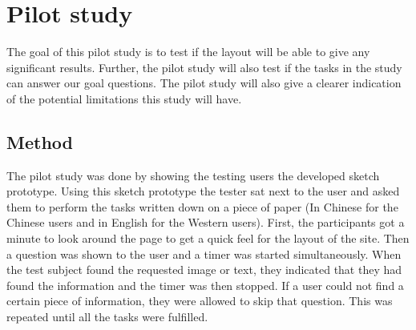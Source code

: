 
\chapter{Pilot study} %

\label{Pilotstudy} %

The goal of this pilot study is to test if the layout will be able to give any significant results. Further, the pilot study will also test if the tasks in the study can answer our goal questions. The pilot study will also give a clearer indication of the potential limitations this study will have.
\section{Method}
The pilot study was done by showing the testing users the developed sketch prototype. Using this sketch prototype the tester sat next to the user and asked them to perform the tasks written down on a piece of paper (In Chinese for the Chinese users and in English for the Western users). First, the participants got a minute to look around the page to get a quick feel for the layout of the site. Then a question was shown to the user and a timer was started simultaneously. When the test subject found the requested image or text, they indicated that they had found the information and the timer was then stopped. If a user could not find a certain piece of information, they were allowed to skip that question. This was repeated until all the tasks were fulfilled.

